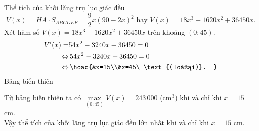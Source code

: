 \begin{ex}
{Thể tích của khối lăng trụ lục giác đều
\[V(x)=HA\cdot S_{ABCDEF}=\dfrac{9}{2}x{\left(90-2x\right)^2}\,\,
\text{hay}\,\, V(x)=18x^3-1620x^2+36450x.\]
Xét hàm số $V(x)=18x^3-1620x^2+36450x$ trên khoảng $\left(0;45\right)$.
\begin{align*}
V'(x)=& 54x^2-3240x+36450 =0\\
\Leftrightarrow &\, 54x^2-3240x+36450=0\\
\Leftrightarrow&\, \hoac{&x=15\\&x=45\ \text{(loại)}. }
\end{align*}
Bảng biến thiên
\begin{center}
\end{center}
Từ bảng biến thiên ta có $\max\limits_{(0;45)}V(x)=243\,000$ (cm$^3$) khi và chỉ khi $x=15$ cm.\\
Vậy thể tích của khối lăng trụ lục giác đều lớn nhất khi và chỉ khi $x=15$ cm.
}
\end{ex}

